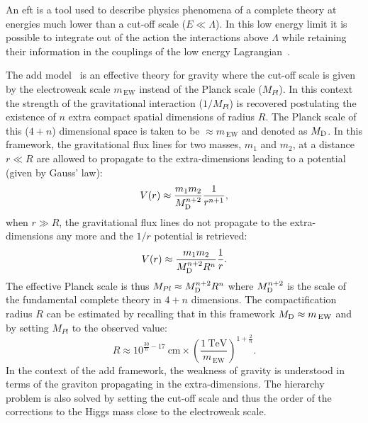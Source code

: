 An \gls{eft} is a tool used to describe physics phenomena of a complete theory
at energies much lower than a cut-off scale ($E \ll \Lambda$). In this low
energy limit it is possible to integrate out of the action the interactions
above $\Lambda$ while retaining their information in the couplings of the low
energy Lagrangian~\cite{EFTReview}.

The \gls{add} model~\cite{ADDPaper} is an effective theory for gravity where the
cut-off scale is given by the electroweak scale $m_\mathrm{\, EW}$ instead of
the Planck scale ($M_{Pl}$). In this context the strength of the gravitational
interaction ($1/M_{Pl}$) is recovered postulating the existence of $n$ extra
compact spatial dimensions of radius $R$. The Planck scale of this ($4 + n$)
dimensional space is taken to be $\approx m_\mathrm{\, EW}$ and denoted as
$M_\mathrm{D}$. In this framework, the gravitational flux lines for two masses, $m_1$ and
$m_2$, at a distance $r \ll R$ are allowed to propagate to the extra-dimensions
leading to a potential (given by Gauss' law):
\begin{equation}
  \label{eq:67}
  V(r) \approx \frac{m_1 m_2}{M_\mathrm{D}^{n + 2}} \frac{1}{r^{n + 1}},
\end{equation}
when $r \gg R$, the gravitational flux lines do not propagate to the
extra-dimensions any more and the $1/r$ potential is retrieved:
\begin{equation}
  \label{eq:68}
  V(r) \approx \frac{m_1 m_2}{M_\mathrm{D}^{n + 2} R^n} \frac{1}{r}.
\end{equation}
The effective Planck scale is thus $M_{Pl} \approx M_\mathrm{D}^{n + 2} R^n$ where
$M_\mathrm{D}^{n + 2}$ is the scale of the fundamental complete theory in $4 + n$
dimensions. The compactification radius $R$ can be estimated by recalling that
in this framework $M_\mathrm{D} \approx m_\mathrm{\, EW}$ and by setting $M_{Pl}$ to the
observed value:
\begin{equation}
  \label{eq:69}
  R \approx 10^{\frac{30}{n} - 17}~\mathrm{cm} \times \left(
    \frac{1~\mathrm{TeV}}{m_\mathrm{\, EW}} \right)^{1 + \frac{2}{n}}.
\end{equation}
In the context of the \gls{add} framework, the weakness of gravity is understood
in terms of the graviton propagating in the extra-dimensions. The hierarchy
problem is also solved by setting the cut-off scale and thus the order of the
corrections to the Higgs mass close to the electroweak scale.

